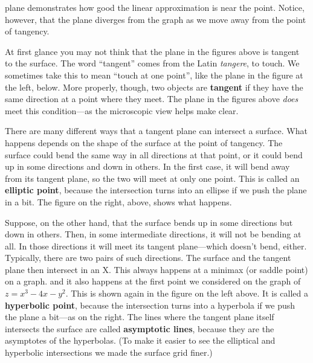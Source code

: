 {{{{\mbox{}

\vspace{132pt}

\noindent
plane demonstrates how good the linear approximation is near the point.  Notice, however, that the plane diverges from the graph as we move away from the point of tangency.

	At first glance you may not think that the plane 
in the figures above is tangent to the surface.  The word ``tangent'' comes from the Latin {\em tangere}, to touch.  We sometimes take this to mean ``touch at one point'', like the plane in the figure at the left, below.  More properly, though, two objects are {\bf tangent} if they have the same direction at a point where they meet.  The plane in the figures above {\em does\/} meet this condition---as the microscopic view helps make clear. 
 
\vspace{155pt}

	There are many different ways that a tangent plane can intersect a surface.  What happens depends on the shape of the surface at the point of tangency.  The surface could bend the same way in all directions at that point, or it could bend up in some directions and down in others.  In the first case,  
it will bend away from its tangent plane, so the two will meet at only one point.  This is called an {\bf elliptic point}, because the intersection turns into an ellipse if we push the plane in a bit.   The figure on the right, above, shows what happens.  



\mbox{} 


\vspace{135pt}

	Suppose, on the other hand, that the surface bends up in some directions but down in others.  Then, in some intermediate directions, it will not be bending at all.  
In those directions it will meet its tangent plane---which doesn't bend, either.  Typically, there are two pairs of such directions.  The surface and the tangent plane then intersect in an X.  This always happens at a minimax (or saddle point) on a graph. and it also happens at the first point we considered on the graph of $z = x^3 - 4x - y^2$.  This is shown again in the figure on the left above.  It is called a {\bf hyperbolic point}, because the intersection turns into a hyperbola if we push the plane a bit---as on the right.  The lines where the tangent plane itself intersects the surface are called {\bf asymptotic lines}, because they are the asymptotes of the hyperbolas.  (To make it easier to see the elliptical and hyperbolic intersections we made the surface grid finer.)

}}}}
